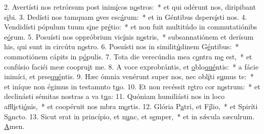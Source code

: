2. Avertísti nos retrórsum post inim\uline{í}cos n\uline{o}stros:~* et qui odérunt nos, diripibant s\uline{i}bi.
3. Dedísti nos tamquam \uline{o}ves esc\uline{á}rum:~* et in Géntibus dspers\uline{í}sti nos.
4. Vendidísti pópulum tuum s\uline{i}ne pr\uline{é}tio:~* et non fuit multitúdo in commutatiónibs e\uline{ó}rum.
5. Posuísti nos oppróbrium vic\uline{í}nis n\uline{o}stris,~* subsannatiónem et derísum his, qui sunt in circútu n\uline{o}stro.
6. Posuísti nos in similit\uline{ú}dinem G\uline{é}ntibus:~* commotiónem cápits in p\uline{ó}pulis.
7. Tota die verecúndia mea c\uline{o}ntra m\uline{e} est,~* et confúsio faciéi meæ coopru\uline{i}t me.
8. A voce exprobrántis, et \uline{o}blo\uline{qué}ntis:~* a fácie inimíci, et prse\uline{qué}ntis.
9. Hæc ómnia venérunt super nos, nec obl\uline{í}ti s\uline{u}mus te:~* et iníque non égimus in testamnto t\uline{u}o.
10. Et non recéssit r\uline{e}tro cor n\uline{o}strum:~* et declinásti sémitas nostras a va t\uline{u}a:
11. Quóniam humiliásti nos in loco affl\uline{i}cti\uline{ó}nis,~* et coopéruit nos mbra m\uline{o}rtis.
12. Glória P\uline{a}tri, et F\uline{í}lio,~* et Spiríti S\uline{a}ncto.
13. Sicut erat in princípio, et n\uline{u}nc, et s\uline{e}mper,~* et in sǽcula sæculrum. \uline{A}men.
